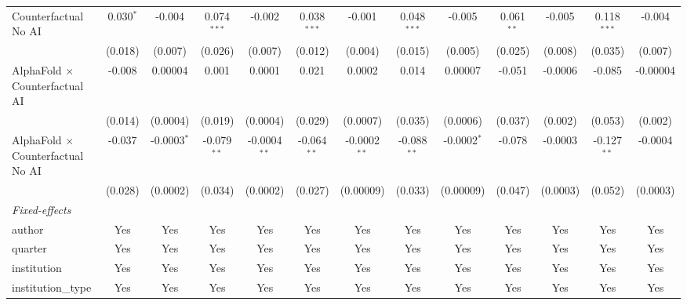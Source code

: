 \begin{tabular}{lcccccccccccc}
   Counterfactual No AI                     & 0.030$^{*}$   & -0.004        & 0.074$^{***}$ & -0.002         & 0.038$^{***}$ & -0.001         & 0.048$^{***}$ & -0.005        & 0.061$^{**}$  & -0.005        & 0.118$^{***}$ & -0.004\\   
                                            & (0.018)       & (0.007)       & (0.026)       & (0.007)        & (0.012)       & (0.004)        & (0.015)       & (0.005)       & (0.025)       & (0.008)       & (0.035)       & (0.007)\\   
   AlphaFold $\times$ Counterfactual AI     & -0.008        & 0.00004       & 0.001         & 0.0001         & 0.021         & 0.0002         & 0.014         & 0.00007       & -0.051        & -0.0006       & -0.085        & -0.00004\\   
                                            & (0.014)       & (0.0004)      & (0.019)       & (0.0004)       & (0.029)       & (0.0007)       & (0.035)       & (0.0006)      & (0.037)       & (0.002)       & (0.053)       & (0.002)\\   
   AlphaFold $\times$ Counterfactual No AI  & -0.037        & -0.0003$^{*}$ & -0.079$^{**}$ & -0.0004$^{**}$ & -0.064$^{**}$ & -0.0002$^{**}$ & -0.088$^{**}$ & -0.0002$^{*}$ & -0.078        & -0.0003       & -0.127$^{**}$ & -0.0004\\   
                                            & (0.028)       & (0.0002)      & (0.034)       & (0.0002)       & (0.027)       & (0.00009)      & (0.033)       & (0.00009)     & (0.047)       & (0.0003)      & (0.052)       & (0.0003)\\   
   \midrule
   \emph{Fixed-effects}\\
   author                                   & Yes           & Yes           & Yes           & Yes            & Yes           & Yes            & Yes           & Yes           & Yes           & Yes           & Yes           & Yes\\  
   quarter                                  & Yes           & Yes           & Yes           & Yes            & Yes           & Yes            & Yes           & Yes           & Yes           & Yes           & Yes           & Yes\\  
   institution                              & Yes           & Yes           & Yes           & Yes            & Yes           & Yes            & Yes           & Yes           & Yes           & Yes           & Yes           & Yes\\  
   institution\_type                        & Yes           & Yes           & Yes           & Yes            & Yes           & Yes            & Yes           & Yes           & Yes           & Yes           & Yes           & Yes\\  

\end{tabular}
